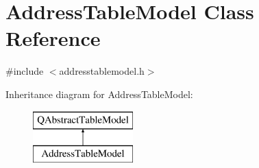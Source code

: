 \hypertarget{class_address_table_model}{}\section{Address\+Table\+Model Class Reference}
\label{class_address_table_model}


{\ttfamily \#include $<$addresstablemodel.\+h$>$}

Inheritance diagram for Address\+Table\+Model\+:\begin{figure}[H]
\begin{center}
\leavevmode
\includegraphics[height=2.000000cm]{class_address_table_model}
\end{center}
\end{figure}

